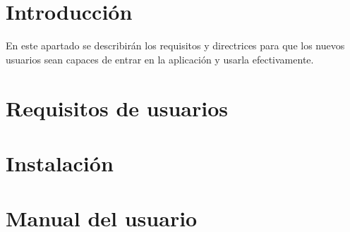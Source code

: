 
\section{Introducción}

En este apartado se describirán los requisitos y directrices para que los nuevos usuarios sean capaces de entrar en la aplicación y usarla efectivamente.

\section{Requisitos de usuarios}



\section{Instalación}


\section{Manual del usuario}



